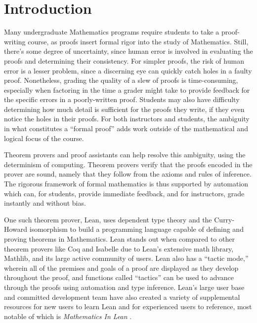 
\chapter{Introduction}

Many undergraduate Mathematics programs require students to take 
a proof-writing course, as proofs insert formal rigor into the 
study of Mathematics. Still, there’s some degree of uncertainty, 
since human error is involved in evaluating the proofs and 
determining their consistency. For 
simpler proofs, the risk of human error is a lesser problem, 
since a discerning eye can quickly catch holes in a faulty proof. 
Nonetheless, grading the quality of a slew of proofs is 
time-consuming, especially when factoring in the time a grader 
might take to provide feedback for the specific errors in a 
poorly-written proof. Students may also have difficulty
determining how much detail is sufficient for the proofs they
write, if they even notice the holes in their proofs. For 
both instructors and students, the ambiguity in what constitutes
a ``formal proof'' adds work outside of the mathematical and 
logical focus of the course.

Theorem provers and proof assistants can help resolve this ambiguity,
using the determinism of computing. Theorem provers verify that
the proofs encoded in the prover are sound, namely that they follow
from the axioms and rules of inference. The rigorous framework
of formal mathematics is thus supported by automation which can, 
for students, provide immediate feedback, 
and for instructors, grade instantly and without bias.

One such theorem prover, Lean,
uses dependent type theory and the Curry-Howard isomorphism 
to build a programming language capable of defining and proving 
theorems in Mathematics. Lean stands out when compared to other
theorem provers like Coq and Isabelle due to Lean's
extensive math library, Mathlib, and its large active community 
of users. Lean also has a “tactic mode,” wherein all of the 
premises and goals of a proof are displayed 
as they develop throughout the proof, and functions called 
“tactics” can be used to advance through the proofs using 
automation and type inference. Lean’s large user base and 
committed development team have also created a variety of 
supplemental resources for new users to learn Lean and for 
experienced users to reference, most notable of which is 
\textit{Mathematics In Lean} \cite{MIL}.

